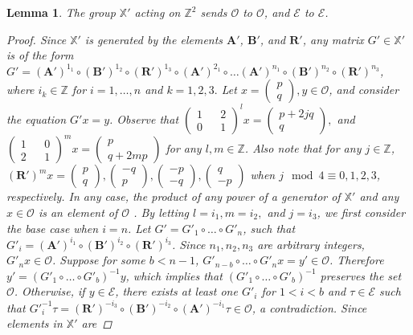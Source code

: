 \documentclass[]{article}
\newtheorem{lem}{Lemma}[section]
\begin{document}
\newpage
\begin{lem}
The group $\mathbb{X}'$ acting on $\mathbb{Z}^2$ sends $\mathcal{O}$ to $\mathcal{O}$, and $\mathcal{E}$ to $\mathcal{E}$.
\begin{proof}
Since $\mathbb{X}'$ is generated by the elements $\mathbf{A}'$, $\mathbf{B}'$, and $\mathbf{R}'$, any matrix $G'\in\mathbb{X}'$ is of the form $G' = (\mathbf{A}')^{1_1}\circ(\mathbf{B}')^{1_2}\circ(\mathbf{R}')^{1_3}\circ(\mathbf{A}')^{2_1}\circ\dots(\mathbf{A}')^{n_1}\circ(\mathbf{B}')^{n_2}\circ(\mathbf{R}')^{n_3}$, where $i_k\in\mathbb{Z}$ for $i=1,\dots,n$ and $k=1,2,3.$ Let $x=\left(\begin{matrix}p \\ q  \end{matrix}\right),y\in\mathcal{O}$, and consider the equation $G'x=y$. Observe that $\left(\begin{matrix}1 && 2 \\ 0 && 1\end{matrix}\right)^l x=\left(\begin{matrix}p+2jq \\ q  \end{matrix}\right),$ and $ \left(\begin{matrix}1 && 0 \\ 2 && 1\end{matrix}\right)^m x=\left(\begin{matrix}p \\ q+2mp  \end{matrix}\right)$ for any $l,m\in\mathbb{Z}$. Also note that for any $j\in\mathbb{Z}$, $(\mathbf{R}')^{m}x=\left(\begin{matrix}p \\ q  \end{matrix}\right),\left(\begin{matrix}-q\\ p  \end{matrix}\right),\left(\begin{matrix}-p \\ -q  \end{matrix}\right),\left(\begin{matrix}q \\ -p  \end{matrix}\right)$ when $j \mod{4}\equiv0,1,2,3$, respectively. In any case, the product of any power of a generator of $\mathbb{X}'$ and any $x\in\mathcal{O}$ is an element of $\mathcal{O}$ . By letting $l=i_1,m=i_2,$ and $j=i_3$, we first consider the base case when $i=n$. Let $G'=G'_1\circ\dots\circ G'_n$, such that $G'_i=(\mathbf{A}')^{i_1}\circ(\mathbf{B}')^{i_2}\circ(\mathbf{R}')^{i_3}$. Since $n_1,n_2,n_3$ are arbitrary integers, $G'_n x \in\mathcal{O}$. Suppose for some $b< n-1$, $G'_{n-b}\circ\dots\circ G'_n x =y'\in\mathcal{O}$. Therefore $y'=(G'_1\circ\dots\circ G'_{b})^{-1}y$, which implies that $(G'_1\circ\dots\circ G'_{b})^{-1}$ preserves the set $\mathcal{O}$. Otherwise, if $y\in\mathcal{E}$, there exists at least one $G'_i$ for $1< i< b$ and $\tau\in\mathcal{E}$ such that $G'^{-1}_i \tau = (\mathbf{R}')^{-i_3}\circ(\mathbf{B}')^{-i_2}\circ(\mathbf{A}')^{-i_1} \tau \in \mathcal{O}$, a contradiction. Since elements in $\mathbb{X}'$ are 
\end{proof}
\end{lem}
\end{document}

